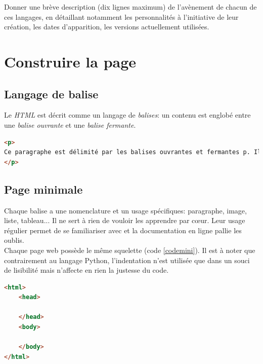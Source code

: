 \documentclass[a4paper,11pt]{article}
\begin{document}
\begin{Form}
\begin{activite}Donner une brève description (dix lignes maximum) de l'avènement de chacun de ces langages, en détaillant notamment les personnalités à l'initiative de leur création, les dates d'apparition, les versions actuellement utilisées.
\end{activite}
\section{Construire la page}
\subsection{Langage de balise}
Le \emph{HTML} est décrit comme un langage de \emph{balises}: un contenu est englobé entre une \emph{balise ouvrante} et une \emph{balise fermante}.
\begin{code}[!h]
\begin{lstlisting}[language=html]
<p>
Ce paragraphe est délimité par les balises ouvrantes et fermantes p. Il faut remarquer l'écriture de ces balises.
</p>
\end{lstlisting}
\label{balise}
\end{code}
\subsection{Page minimale}
Chaque balise a une nomenclature et un usage spécifiques: paragraphe, image, liste, tableau... Il ne sert à rien de vouloir les apprendre par cœur. Leur usage régulier permet de se familiariser avec et la documentation en ligne pallie les oublis.\\
Chaque page web possède le même squelette (code \ref{codemini}). Il est à noter que contrairement au langage Python, l'indentation n'est utilisée que dans un souci de lisibilité mais n'affecte en rien la justesse du code.
\begin{code}[!h]
\begin{lstlisting}[language=html]
<html>
	<head>

	</head>
	<body>
	
	</body>
</html>
\end{lstlisting}
\label{codemini}
\end{code}


\end{Form}
\end{document}
